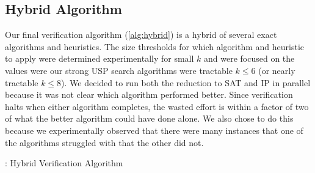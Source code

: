 \documentclass[11pt]{article}
\begin{document}




\subsection{Hybrid Algorithm}

Our final verification algorithm (\autoref{alg:hybrid}) is a hybrid of
several exact algorithms and heuristics.  The size thresholds
for which algorithm and heuristic to apply were determined
experimentally for small $k$ and were focused on the values were our
strong USP search algorithms were tractable $k \le 6$ (or nearly
tractable $k \le 8$).  We decided to run both the reduction to SAT and
IP in parallel because it was not clear which algorithm performed
better.  Since verification halts when either algorithm completes, the
wasted effort is within a factor of two of what the better algorithm
could have done alone.  We also chose to do this because we
experimentally observed that there were many instances that one of the
algorithms struggled with that the other did not.

\begin{algorithm}[t]
  \caption{: Hybrid Verification Algorithm}
  \label{alg:hybrid}
\begin{algorithmic}[1]
    \EndIf
    \EndIf
    \EndIf
\end{algorithmic}
\end{algorithm}
\end{document}
